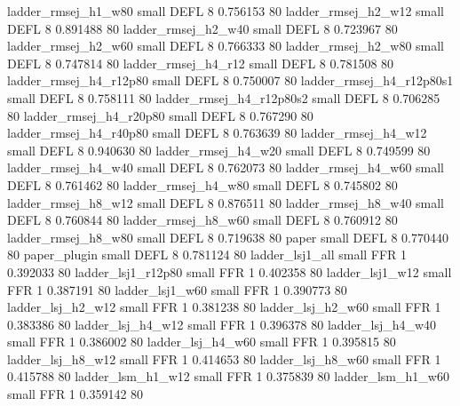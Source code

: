      ladder_rmsej_h1_w80      small     DEFL                 8 0.756153 80
     ladder_rmsej_h2_w12      small     DEFL                 8 0.891488 80
     ladder_rmsej_h2_w40      small     DEFL                 8 0.723967 80
     ladder_rmsej_h2_w60      small     DEFL                 8 0.766333 80
     ladder_rmsej_h2_w80      small     DEFL                 8 0.747814 80
     ladder_rmsej_h4_r12      small     DEFL                 8 0.781508 80
  ladder_rmsej_h4_r12p80      small     DEFL                 8 0.750007 80
ladder_rmsej_h4_r12p80s1      small     DEFL                 8 0.758111 80
ladder_rmsej_h4_r12p80s2      small     DEFL                 8 0.706285 80
  ladder_rmsej_h4_r20p80      small     DEFL                 8 0.767290 80
  ladder_rmsej_h4_r40p80      small     DEFL                 8 0.763639 80
     ladder_rmsej_h4_w12      small     DEFL                 8 0.940630 80
     ladder_rmsej_h4_w20      small     DEFL                 8 0.749599 80
     ladder_rmsej_h4_w40      small     DEFL                 8 0.762073 80
     ladder_rmsej_h4_w60      small     DEFL                 8 0.761462 80
     ladder_rmsej_h4_w80      small     DEFL                 8 0.745802 80
     ladder_rmsej_h8_w12      small     DEFL                 8 0.876511 80
     ladder_rmsej_h8_w40      small     DEFL                 8 0.760844 80
     ladder_rmsej_h8_w60      small     DEFL                 8 0.760912 80
     ladder_rmsej_h8_w80      small     DEFL                 8 0.719638 80
                   paper      small     DEFL                 8 0.770440 80
            paper_plugin      small     DEFL                 8 0.781124 80
         ladder_lsj1_all      small      FFR                 1 0.392033 80
      ladder_lsj1_r12p80      small      FFR                 1 0.402358 80
         ladder_lsj1_w12      small      FFR                 1 0.387191 80
         ladder_lsj1_w60      small      FFR                 1 0.390773 80
       ladder_lsj_h2_w12      small      FFR                 1 0.381238 80
       ladder_lsj_h2_w60      small      FFR                 1 0.383386 80
       ladder_lsj_h4_w12      small      FFR                 1 0.396378 80
       ladder_lsj_h4_w40      small      FFR                 1 0.386002 80
       ladder_lsj_h4_w60      small      FFR                 1 0.395815 80
       ladder_lsj_h8_w12      small      FFR                 1 0.414653 80
       ladder_lsj_h8_w60      small      FFR                 1 0.415788 80
       ladder_lsm_h1_w12      small      FFR                 1 0.375839 80
       ladder_lsm_h1_w60      small      FFR                 1 0.359142 80
